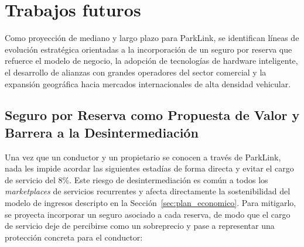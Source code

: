 \section{Trabajos futuros}\label{sec:trabajos_futuros}

Como proyección de mediano y largo plazo para ParkLink, se identifican líneas de evolución estratégica orientadas a la incorporación de un seguro por reserva que refuerce el modelo de negocio, la adopción de tecnologías de hardware inteligente, el desarrollo de alianzas con grandes operadores del sector comercial y la expansión geográfica hacia mercados internacionales de alta densidad vehicular.

\subsection{Seguro por Reserva como Propuesta de Valor y Barrera a la Desintermediación}

Una vez que un conductor y un propietario se conocen a través de ParkLink, nada les impide acordar las siguientes estadías de forma directa y evitar el cargo de servicio del 8\%. Este riesgo de desintermediación es común a todos los \textit{marketplaces} de servicios recurrentes y afecta directamente la sostenibilidad del modelo de ingresos descripto en la Sección~\ref{sec:plan_economico}. Para mitigarlo, se proyecta incorporar un seguro asociado a cada reserva, de modo que el cargo de servicio deje de percibirse como un sobreprecio y pase a representar una protección concreta para el conductor:

